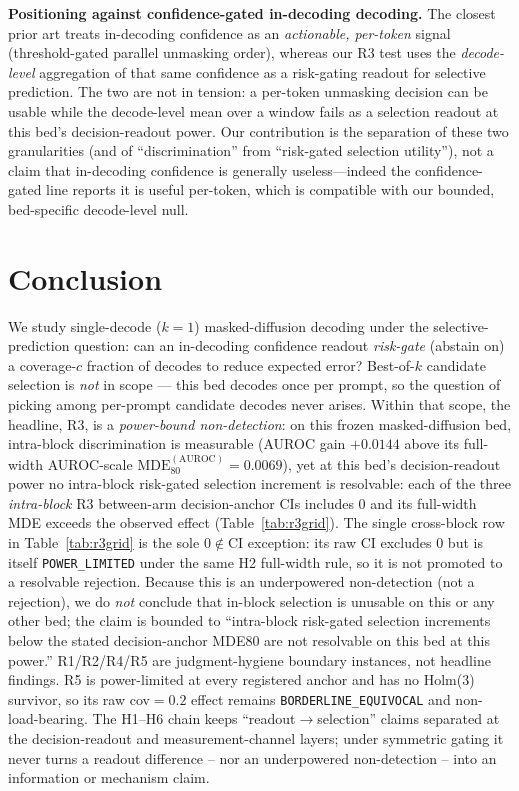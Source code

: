 \documentclass{article}
\begin{document}
\textbf{Positioning against confidence-gated in-decoding decoding.} The closest prior art
\citep{wu2025fastdllm} treats in-decoding confidence as an \emph{actionable, per-token}
signal (threshold-gated parallel unmasking order), whereas our R3 test uses the \emph{decode-
level} aggregation of that same confidence as a risk-gating readout for selective prediction.
The two are not in
tension: a per-token unmasking decision can be usable while the decode-level mean over a
window fails as a selection readout at this bed's decision-readout power. Our contribution is
the separation of these two granularities (and of ``discrimination'' from ``risk-gated selection
utility''), not a claim that in-decoding confidence is generally useless---indeed the
confidence-gated line reports it is useful per-token, which is compatible with our bounded,
bed-specific decode-level null.

\section{Conclusion}
\label{sec:conclusion}

We study single-decode ($k{=}1$) masked-diffusion decoding under the selective-prediction
question: can an in-decoding confidence readout \emph{risk-gate} (abstain on) a coverage-$c$
fraction of decodes to reduce expected error? Best-of-$k$ candidate selection is \emph{not}
in scope --- this bed decodes once per prompt, so the question of picking among per-prompt
candidate decodes never arises. Within that scope, the headline, R3, is a
\emph{power-bound non-detection}: on this frozen masked-diffusion
bed, intra-block discrimination is measurable (AUROC gain $+0.0144$ above its full-width
AUROC-scale $\mathrm{MDE}_{80}^{(\mathrm{AUROC})}{=}0.0069$), yet at this bed's decision-readout
power no intra-block risk-gated selection increment is resolvable: each of the three
\emph{intra-block} R3 between-arm decision-anchor CIs includes $0$ and its full-width MDE exceeds
the observed effect (Table~\ref{tab:r3grid}). The single cross-block row in
Table~\ref{tab:r3grid} is the sole $0\notin$CI exception: its raw CI excludes $0$ but is itself
\texttt{POWER\_LIMITED} under the same H2 full-width rule, so it is not promoted to a resolvable
rejection. Because
this is an underpowered non-detection (not a rejection), we do \emph{not} conclude that
in-block selection is unusable on this or any other bed; the claim is bounded to
``intra-block risk-gated selection increments below the stated decision-anchor MDE80 are not
resolvable on this bed at this power.'' R1/R2/R4/R5 are judgment-hygiene boundary instances, not
headline findings. R5 is power-limited at every registered anchor and has no Holm(3)
survivor, so its raw cov$=0.2$ effect remains \texttt{BORDERLINE\_EQUIVOCAL} and
non-load-bearing. The H1--H6 chain keeps ``readout$\rightarrow$selection'' claims separated
at the decision-readout and measurement-channel layers; under symmetric gating it never
turns a readout difference -- nor an underpowered non-detection -- into an information or
mechanism claim.
\end{document}
